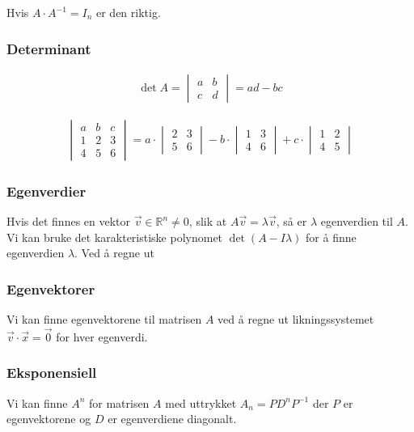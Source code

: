 \documentclass[12pt,norsk,a4paper]{article}
\begin{document}
Hvis $A \cdot A^{-1} = I_{n}$ er den riktig.

\subsubsection{Determinant}
\begin{align*}
\det A =
\begin{vmatrix}
a	&	b	\\
c	&	d
\end{vmatrix}
= ad - bc
\end{align*}

\begin{align*}
\begin{vmatrix}
a	&	b	&	c	\\
1	&	2	&	3	\\
4	&	5	&	6
\end{vmatrix}
=
a \cdot 
\begin{vmatrix}
2	&	3	\\
5	&	6
\end{vmatrix}
- b \cdot
\begin{vmatrix}
1	&	3	\\
4	&	6
\end{vmatrix}
+ c \cdot
\begin{vmatrix}
1	&	2	\\
4	&	5
\end{vmatrix}
\end{align*}

\subsubsection{Egenverdier}
Hvis det finnes en vektor $\vec{v} \in \mathbb{R}^{n} \neq 0$, slik at $A \vec{v} = \lambda \vec{v}$, så er $\lambda$ egenverdien til $A$. Vi kan bruke det karakteristiske polynomet $\det(A - I\lambda)$ for å finne egenverdien $\lambda$. Ved å regne ut 

\subsubsection{Egenvektorer}
Vi kan finne egenvektorene til matrisen $A$ ved å regne ut likningssystemet $\vec{v} \cdot \vec{x} = \vec{0}$ for hver egenverdi.

\subsubsection{Eksponensiell}
Vi kan finne $A^{n}$ for matrisen $A$ med uttrykket $A_{n}=PD^{n}P^{-1}$ der $P$ er egenvektorene og $D$ er egenverdiene diagonalt.
\end{document}
